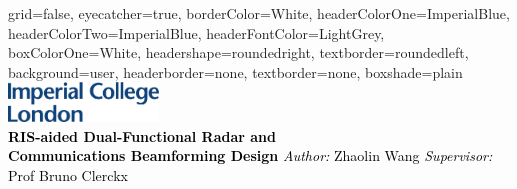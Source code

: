 \documentclass[paperwidth=841mm,paperheight=1300mm,portrait]{baposter}
\begin{document}
\begin{poster}{
  grid=false,
  eyecatcher=true,
  borderColor=White,
  headerColorOne=ImperialBlue,
  headerColorTwo=ImperialBlue,
  headerFontColor=LightGrey,
  boxColorOne=White,
  headershape=roundedright,
  textborder=roundedleft,
  background=user,
  headerborder=none,
  textborder=none,
  boxshade=plain
}
{
    \includegraphics[width=0.3\textwidth]{logos/Imperial_logo}
}
{
  {\sf\bf \vspace{2pt} \\
  \textcolor{Black}{RIS-aided Dual-Functional Radar and \\\vspace{4pt}
   Communications Beamforming Design}}
}
{ 
  \vspace{5pt}
  \textcolor{Black}{\textit{Author:} Zhaolin Wang \quad \textit{Supervisor:} Prof Bruno Clerckx}
}


\end{poster}
\end{document}
